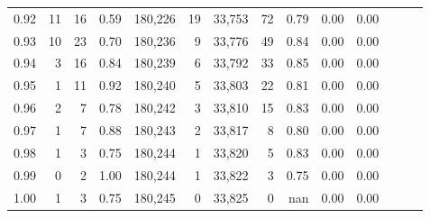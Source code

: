 \begin{tabular}{rrrrrrrrrrrrrr}
0.92 &     11 &     16 &  0.59 &  180,226 &       19 &  33,753 &      72 &  0.79 &  0.00 &      0.00 \\
0.93 &     10 &     23 &  0.70 &  180,236 &        9 &  33,776 &      49 &  0.84 &  0.00 &      0.00 \\
0.94 &      3 &     16 &  0.84 &  180,239 &        6 &  33,792 &      33 &  0.85 &  0.00 &      0.00 \\
0.95 &      1 &     11 &  0.92 &  180,240 &        5 &  33,803 &      22 &  0.81 &  0.00 &      0.00 \\
0.96 &      2 &      7 &  0.78 &  180,242 &        3 &  33,810 &      15 &  0.83 &  0.00 &      0.00 \\
0.97 &      1 &      7 &  0.88 &  180,243 &        2 &  33,817 &       8 &  0.80 &  0.00 &      0.00 \\
0.98 &      1 &      3 &  0.75 &  180,244 &        1 &  33,820 &       5 &  0.83 &  0.00 &      0.00 \\
0.99 &      0 &      2 &  1.00 &  180,244 &        1 &  33,822 &       3 &  0.75 &  0.00 &      0.00 \\
1.00 &      1 &      3 &  0.75 &  180,245 &        0 &  33,825 &       0 &   nan &  0.00 &      0.00 \\
\bottomrule
\end{tabular}
